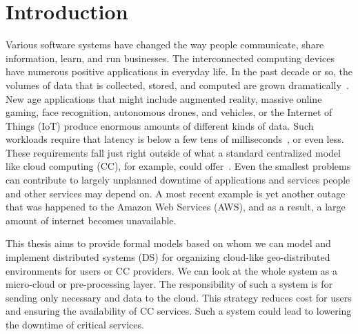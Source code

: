 \pagestyle{fancy}
\fancyhf{}
\fancyhead[RE,LO]{\leftmark}
\fancyfoot[CE,CO]{\thepage}
\chapter{Introduction}\label{chapter:Intro}
%
Various software systems have changed the way people communicate, share information, learn, and run businesses. The interconnected computing devices have numerous positive applications in everyday life. In the past decade or so, the volumes of data that is collected, stored, and computed are grown dramatically~\cite{ChiangZ16}. New age applications that might include augmented reality, massive online gaming, face recognition, autonomous drones, and vehicles, or the Internet of Things (IoT) produce enormous amounts of different kinds of data. Such workloads require that latency is below a few tens of milliseconds~\cite{ChiangZ16}, or even less. These requirements fall just right outside of what a standard centralized model like cloud computing (CC), for example, could offer~\cite{ChiangZ16}. Even the smallest problems can contribute to largely unplanned downtime of applications and services people and other services may depend on. A most recent example is yet another outage that was happened to the Amazon Web Services (AWS), and as a result, a large amount of internet becomes unavailable.

This thesis aims to provide formal models based on whom we can model and implement distributed systems (DS) for organizing cloud-like geo-distributed environments for users or CC providers. We can look at the whole system as a micro-cloud or pre-processing layer. The responsibility of such a system is for sending only necessary and data to the cloud. This strategy reduces cost for users and ensuring the availability of CC services. Such a system could lead to lowering the downtime of critical services.

